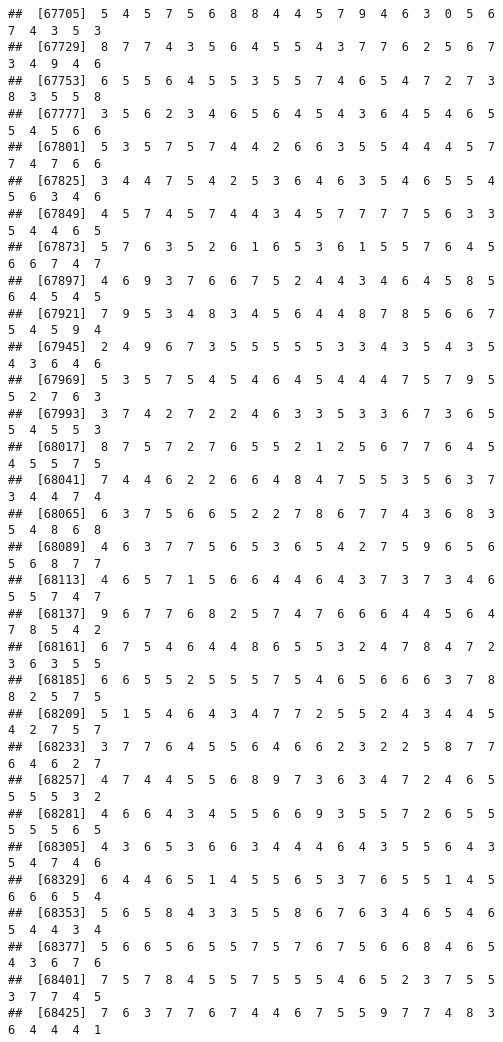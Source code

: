 \documentclass[
]{book}
\begin{document}
\begin{verbatim}
##  [67705]  5  4  5  7  5  6  8  8  4  4  5  7  9  4  6  3  0  5  6  7  4  3  5  3
##  [67729]  8  7  7  4  3  5  6  4  5  5  4  3  7  7  6  2  5  6  7  3  4  9  4  6
##  [67753]  6  5  5  6  4  5  5  3  5  5  7  4  6  5  4  7  2  7  3  8  3  5  5  8
##  [67777]  3  5  6  2  3  4  6  5  6  4  5  4  3  6  4  5  4  6  5  5  4  5  6  6
##  [67801]  5  3  5  7  5  7  4  4  2  6  6  3  5  5  4  4  4  5  7  7  4  7  6  6
##  [67825]  3  4  4  7  5  4  2  5  3  6  4  6  3  5  4  6  5  5  4  5  6  3  4  6
##  [67849]  4  5  7  4  5  7  4  4  3  4  5  7  7  7  7  5  6  3  3  5  4  4  6  5
##  [67873]  5  7  6  3  5  2  6  1  6  5  3  6  1  5  5  7  6  4  5  6  6  7  4  7
##  [67897]  4  6  9  3  7  6  6  7  5  2  4  4  3  4  6  4  5  8  5  6  4  5  4  5
##  [67921]  7  9  5  3  4  8  3  4  5  6  4  4  8  7  8  5  6  6  7  5  4  5  9  4
##  [67945]  2  4  9  6  7  3  5  5  5  5  5  3  3  4  3  5  4  3  5  4  3  6  4  6
##  [67969]  5  3  5  7  5  4  5  4  6  4  5  4  4  4  7  5  7  9  5  5  2  7  6  3
##  [67993]  3  7  4  2  7  2  2  4  6  3  3  5  3  3  6  7  3  6  5  5  4  5  5  3
##  [68017]  8  7  5  7  2  7  6  5  5  2  1  2  5  6  7  7  6  4  5  4  5  5  7  5
##  [68041]  7  4  4  6  2  2  6  6  4  8  4  7  5  5  3  5  6  3  7  3  4  4  7  4
##  [68065]  6  3  7  5  6  6  5  2  2  7  8  6  7  7  4  3  6  8  3  5  4  8  6  8
##  [68089]  4  6  3  7  7  5  6  5  3  6  5  4  2  7  5  9  6  5  6  5  6  8  7  7
##  [68113]  4  6  5  7  1  5  6  6  4  4  6  4  3  7  3  7  3  4  6  5  5  7  4  7
##  [68137]  9  6  7  7  6  8  2  5  7  4  7  6  6  6  4  4  5  6  4  7  8  5  4  2
##  [68161]  6  7  5  4  6  4  4  8  6  5  5  3  2  4  7  8  4  7  2  3  6  3  5  5
##  [68185]  6  6  5  5  2  5  5  5  7  5  4  6  5  6  6  6  3  7  8  8  2  5  7  5
##  [68209]  5  1  5  4  6  4  3  4  7  7  2  5  5  2  4  3  4  4  5  4  2  7  5  7
##  [68233]  3  7  7  6  4  5  5  6  4  6  6  2  3  2  2  5  8  7  7  6  4  6  2  7
##  [68257]  4  7  4  4  5  5  6  8  9  7  3  6  3  4  7  2  4  6  5  5  5  5  3  2
##  [68281]  4  6  6  4  3  4  5  5  6  6  9  3  5  5  7  2  6  5  5  5  5  5  6  5
##  [68305]  4  3  6  5  3  6  6  3  4  4  4  6  4  3  5  5  6  4  3  5  4  7  4  6
##  [68329]  6  4  4  6  5  1  4  5  5  6  5  3  7  6  5  5  1  4  5  6  6  6  5  4
##  [68353]  5  6  5  8  4  3  3  5  5  8  6  7  6  3  4  6  5  4  6  5  4  4  3  4
##  [68377]  5  6  6  5  6  5  5  7  5  7  6  7  5  6  6  8  4  6  5  4  3  6  7  6
##  [68401]  7  5  7  8  4  5  5  7  5  5  5  4  6  5  2  3  7  5  5  3  7  7  4  5
##  [68425]  7  6  3  7  7  6  7  4  4  6  7  5  5  9  7  7  4  8  3  6  4  4  4  1

\end{verbatim}
\end{document}
